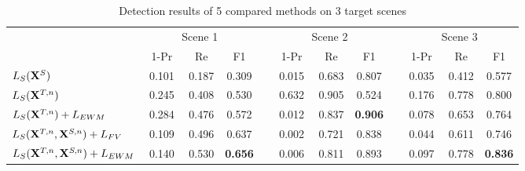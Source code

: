 \documentclass[runningheads]{llncs}
\begin{document}
\begin{table}
\centering
\caption{Detection results of 5 compared methods on 3 target scenes} \label{table:detection results}
\begin{tabular}{l  c c c  c  c c c  c  c c c}
  \hline
    &   \multicolumn{3}{c}{Scene 1}   & & \multicolumn{3}{c}{Scene 2} & &  \multicolumn{3}{c}{Scene 3}   \\
   \cline{2-4} \cline{6-8} \cline{10-12}
    & ~1-Pr~ & ~Re~ & ~F1~ &  & ~1-Pr~ & ~Re~ & ~F1~ &  & ~1-Pr~ & ~Re~ & ~F1~\\
  \hline
  $L_{S}({\bf X}^{S})$ & 0.101 & 0.187 & 0.309 &  & 0.015 & 0.683 & 0.807 &  & 0.035 & 0.412 & 0.577 \\
  $L_{S}({\bf X}^{T,n})$ & 0.245 & 0.408 & 0.530 &  & 0.632 & 0.905 & 0.524 &  & 0.176 & 0.778 & 0.800 \\
  $L_{S}({\bf X}^{T,n})+L_{EWM}$ & 0.284 & 0.476 & 0.572 &  & 0.012 & 0.837 & {\bf 0.906} &  & 0.078 & 0.653 & 0.764 \\
  $L_{S}({\bf X}^{T,n},{\bf X}^{S,n})+L_{FV}$\cite{tzeng2014deep} & 0.109 & 0.496 & 0.637 &  & 0.002 & 0.721 & 0.838 &  & 0.044 & 0.611 & 0.746 \\
  $L_{S}({\bf X}^{T,n},{\bf X}^{S,n})+L_{EWM}$ & 0.140 & 0.530 & {\bf 0.656} &  & 0.006 & 0.811 & 0.893 &  & 0.097 & 0.778 & {\bf 0.836} \\
  \hline
\end{tabular}
\end{table}
\end{document}
